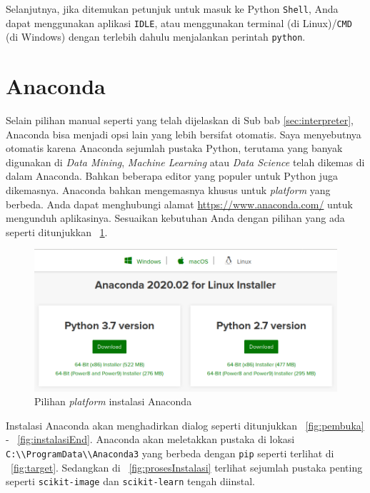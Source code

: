 Selanjutnya, jika ditemukan petunjuk untuk masuk ke Python \texttt{Shell}, Anda dapat menggunakan aplikasi \texttt{IDLE}\texttt{}, atau menggunakan terminal (di Linux)/\texttt{CMD} (di Windows) dengan terlebih dahulu menjalankan perintah \texttt{python}.

\section{Anaconda}
Selain pilihan manual seperti yang telah dijelaskan di Sub bab \ref{sec:interpreter}, Anaconda bisa menjadi opsi lain yang lebih bersifat otomatis. Saya menyebutnya otomatis karena Anaconda sejumlah pustaka Python, terutama yang banyak digunakan di \textit{Data Mining}, \textit{Machine Learning} atau \textit{Data Science} telah dikemas di dalam Anaconda. Bahkan beberapa editor yang populer untuk Python juga dikemasnya. Anaconda bahkan mengemasnya khusus untuk \textit{platform} yang berbeda. Anda dapat menghubungi alamat \url{https://www.anaconda.com/} untuk mengunduh aplikasinya. Sesuaikan kebutuhan Anda dengan pilihan yang ada seperti ditunjukkan \figurename~\ref{fig:platformAnaconda}.

\begin{figure}[h!]
  \begin{center}
    \includegraphics[scale=.5]{pics/anacondaInstall0.png}
    \caption{Pilihan \textit{platform} instalasi Anaconda}
    \label{fig:platformAnaconda}
  \end{center}
\end{figure}

Instalasi Anaconda akan menghadirkan dialog seperti ditunjukkan \figurename~\ref{fig:pembuka} - \figurename~\ref{fig:instalasiEnd}. Anaconda akan meletakkan pustaka di lokasi \texttt{C:\textbackslash\textbackslash ProgramData\textbackslash\textbackslash Anaconda3} yang berbeda dengan \texttt{pip} seperti terlihat di \figurename~\ref{fig:target}. Sedangkan di \figurename~\ref{fig:prosesInstalasi} terlihat sejumlah pustaka penting seperti \texttt{scikit-image} dan \texttt{scikit-learn} tengah diinstal. 


